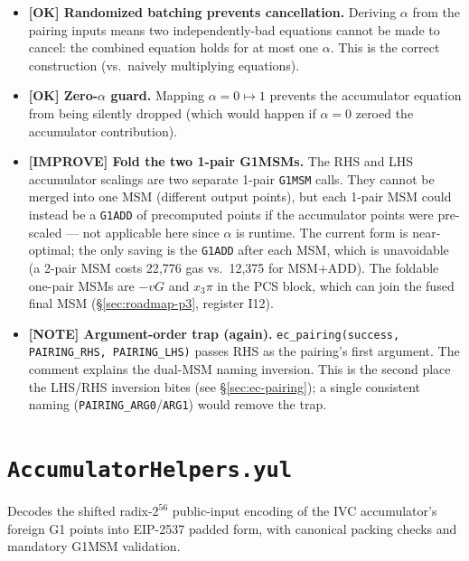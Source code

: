 \begin{itemize}
  \item \textcolor{tracegreen}{\textbf{[OK] Randomized batching prevents
        cancellation.}} Deriving $\alpha$ from the pairing inputs means
        two independently-bad equations cannot be made to cancel: the
        combined equation holds for at most one $\alpha$. This is the
        correct construction (vs.\ naively multiplying equations).
  \item \textcolor{tracegreen}{\textbf{[OK] Zero-$\alpha$ guard.}}
        Mapping $\alpha=0\mapsto 1$ prevents the accumulator equation
        from being silently dropped (which would happen if $\alpha=0$
        zeroed the accumulator contribution).
  \item \textcolor{codegenblue}{\textbf{[IMPROVE] Fold the two 1-pair
        G1MSMs.}} The RHS and LHS accumulator scalings are two separate
        1-pair \texttt{G1MSM} calls. They cannot be merged into one MSM
        (different output points), but each 1-pair MSM could instead be
        a \texttt{G1ADD} of precomputed points if the accumulator
        points were pre-scaled --- not applicable here since $\alpha$ is
        runtime. The current form is near-optimal; the only saving is
        the \texttt{G1ADD} after each MSM, which is unavoidable (a 2-pair
        MSM costs 22{,}776 gas vs.\ 12{,}375 for MSM+ADD). The foldable
        one-pair MSMs are $-vG$ and $x_3\pi$ in the PCS block, which can
        join the fused final MSM (\S\ref{sec:roadmap-p3}, register
        I12).
  \item \textcolor{mathpurple}{\textbf{[NOTE] Argument-order trap
        (again).}} \texttt{ec\_\allowbreak{}pairing(success, PAIRING\_\allowbreak{}RHS,
        PAIRING\_\allowbreak{}LHS)} passes RHS as the pairing's first argument. The
        comment explains the dual-MSM naming inversion. This is the
        second place the LHS/RHS inversion bites (see
        \S\ref{sec:ec-pairing}); a single consistent naming
        (\texttt{PAIRING\_ARG0}/\texttt{ARG1}) would remove the trap.
\end{itemize}

\section{\texttt{AccumulatorHelpers.yul}}
\label{sec:acc-audit}

Decodes the shifted radix-$2^{56}$ public-input encoding of the IVC
accumulator's foreign G1 points into EIP-2537 padded form, with
canonical packing checks and mandatory G1MSM validation.

